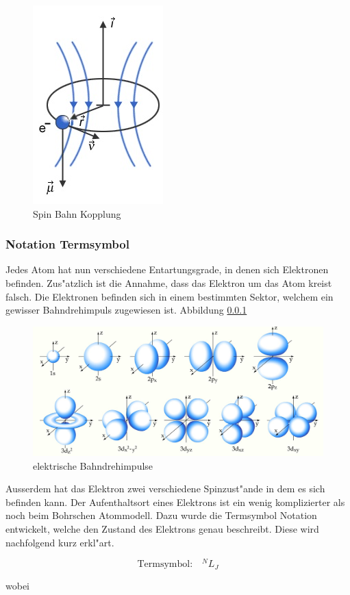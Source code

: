 \begin{refsection}
\begin{figure}
	\centering
	\includegraphics[width=.2\columnwidth]{../vortrag/pictures/feinstrukturelektron.jpg}
	\caption{Spin Bahn Kopplung} %
	\label{atomuhr:spinbahn}
\end{figure}

\subsubsection{Notation Termsymbol}
Jedes Atom hat nun verschiedene Entartungsgrade, in denen sich Elektronen befinden. Zus"atzlich ist die Annahme, dass das Elektron um das Atom kreist falsch. Die Elektronen befinden sich in einem bestimmten Sektor, welchem ein gewisser Bahndrehimpuls zugewiesen ist. 
Abbildung \ref{}
\begin{figure}
	\centering
	\includegraphics[width = 0.8\columnwidth]{../vortrag/pictures/orbitale.JPG}
	\caption{elektrische Bahndrehimpulse} %
	\label{atomuhr:bahndrehimpuls}
\end{figure}
Ausserdem hat das Elektron zwei verschiedene Spinzust"ande in dem es sich befinden kann. Der Aufenthaltsort eines Elektrons ist ein wenig komplizierter als noch beim Bohrschen Atommodell.
Dazu wurde die Termsymbol Notation entwickelt, welche den Zustand des Elektrons genau beschreibt. 
Diese wird nachfolgend kurz erkl"art.

\begin{equation}
	\text{Termsymbol:} \quad ^NL _J
\end{equation}

wobei


\end{refsection}

